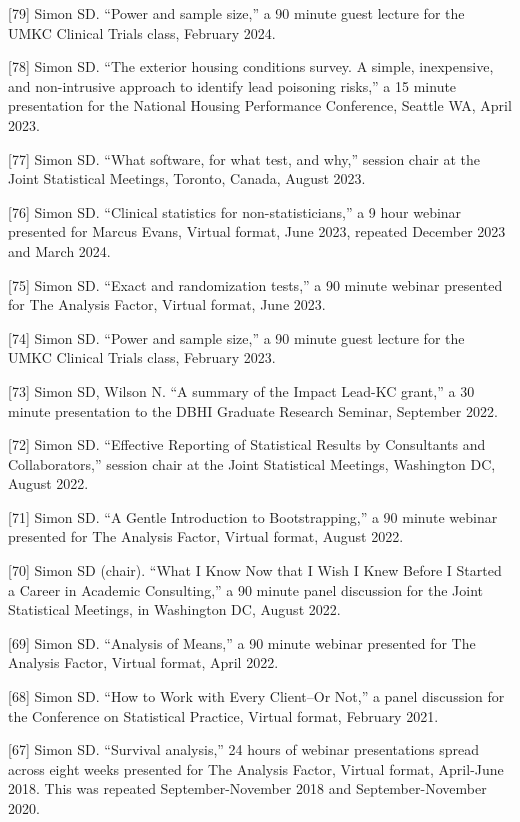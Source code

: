 \documentclass[
  12pt,
]{article}
\begin{document}
{[}79{]} Simon SD. ``Power and sample size,'' a 90 minute guest lecture
for the UMKC Clinical Trials class, February 2024.

{[}78{]} Simon SD. ``The exterior housing conditions survey. A simple,
inexpensive, and non-intrusive approach to identify lead poisoning
risks,'' a 15 minute presentation for the National Housing Performance
Conference, Seattle WA, April 2023.

{[}77{]} Simon SD. ``What software, for what test, and why,'' session
chair at the Joint Statistical Meetings, Toronto, Canada, August 2023.

{[}76{]} Simon SD. ``Clinical statistics for non-statisticians,'' a 9
hour webinar presented for Marcus Evans, Virtual format, June 2023,
repeated December 2023 and March 2024.

{[}75{]} Simon SD. ``Exact and randomization tests,'' a 90 minute
webinar presented for The Analysis Factor, Virtual format, June 2023.

{[}74{]} Simon SD. ``Power and sample size,'' a 90 minute guest lecture
for the UMKC Clinical Trials class, February 2023.

{[}73{]} Simon SD, Wilson N. ``A summary of the Impact Lead-KC grant,''
a 30 minute presentation to the DBHI Graduate Research Seminar,
September 2022.

{[}72{]} Simon SD. ``Effective Reporting of Statistical Results by
Consultants and Collaborators,'' session chair at the Joint Statistical
Meetings, Washington DC, August 2022.

{[}71{]} Simon SD. ``A Gentle Introduction to Bootstrapping,'' a 90
minute webinar presented for The Analysis Factor, Virtual format, August
2022.

{[}70{]} Simon SD (chair). ``What I Know Now that I Wish I Knew Before I
Started a Career in Academic Consulting,'' a 90 minute panel discussion
for the Joint Statistical Meetings, in Washington DC, August 2022.

{[}69{]} Simon SD. ``Analysis of Means,'' a 90 minute webinar presented
for The Analysis Factor, Virtual format, April 2022.

{[}68{]} Simon SD. ``How to Work with Every Client--Or Not,'' a panel
discussion for the Conference on Statistical Practice, Virtual format,
February 2021.

{[}67{]} Simon SD. ``Survival analysis,'' 24 hours of webinar
presentations spread across eight weeks presented for The Analysis
Factor, Virtual format, April-June 2018. This was repeated
September-November 2018 and September-November 2020.
\end{document}
